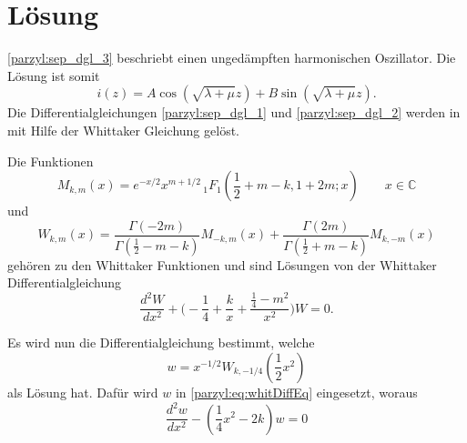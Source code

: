 %
%
%
\section{Lösung
\label{parzyl:section:teil1}}

\eqref{parzyl:sep_dgl_3} beschriebt einen ungedämpften harmonischen Oszillator.
Die Lösung ist somit
\begin{equation}
	i(z) 
	= 
	A\cos{ 
		\left ( 
		\sqrt{\lambda + \mu}z
		\right )}
	+
	B\sin{ 
		\left ( 
		\sqrt{\lambda + \mu}z
		\right )}.
\end{equation}
Die Differentialgleichungen \eqref{parzyl:sep_dgl_1} und \eqref{parzyl:sep_dgl_2} werden in \cite{parzyl:whittaker}
mit Hilfe der Whittaker Gleichung gelöst.
\begin{definition}
    Die Funktionen
    \begin{equation*}
        M_{k,m}(x) = 
    e^{-x/2} x^{m+1/2} \,
    {}_{1} F_{1}
    (
        {\textstyle \frac{1}{2}} 
        + m - k, 1 + 2m; x) \qquad x \in \mathbb{C}
    \end{equation*}
    und
    \begin{equation*}
        W_{k,m}(x) = \frac{
            \Gamma \left( -2m\right)
        }{
            \Gamma \left( {\textstyle \frac{1}{2}} - m - k\right)
        }
        M_{-k, m} \left(x\right)
        +
        \frac{
            \Gamma \left( 2m\right)
        }{
            \Gamma \left( {\textstyle \frac{1}{2}} + m - k\right)
        }
        M_{k, -m} \left(x\right)
    \end{equation*}
    gehören zu den Whittaker Funktionen und sind Lösungen
    von der Whittaker Differentialgleichung
    \begin{equation}
        \frac{d^2W}{d x^2} +
        \biggl( -\frac{1}{4}  + \frac{k}{x} + \frac{\frac{1}{4} - m^2}{x^2} \biggr) W = 0.
        \label{parzyl:eq:whitDiffEq}
    \end{equation}

\end{definition}
Es wird nun die Differentialgleichung bestimmt, welche
\begin{equation}
    w = x^{-1/2} W_{k,-1/4} \left({\textstyle \frac{1}{2}} x^2\right)
\end{equation}
als Lösung hat.
Dafür wird $w$ in \eqref{parzyl:eq:whitDiffEq} eingesetzt, woraus
\begin{equation}
    \frac{d^2 w}{dx^2} - \left(\frac{1}{4} x^2 - 2k\right) w = 0
\label{parzyl:eq:weberDiffEq}
\end{equation}
